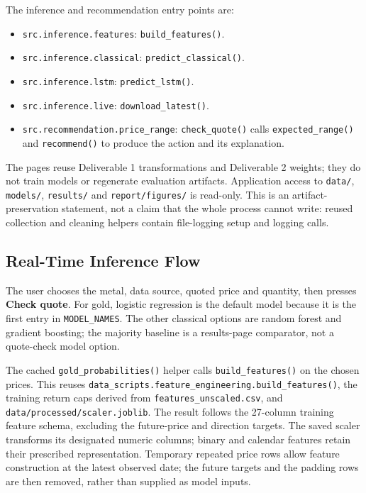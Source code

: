 The inference and recommendation entry points are:
\begin{itemize}
    \item \texttt{src.\allowbreak inference.\allowbreak features}:
    \texttt{build\_\allowbreak features()}.
    \item \texttt{src.\allowbreak inference.\allowbreak classical}:
    \texttt{predict\_\allowbreak classical()}.
    \item \texttt{src.\allowbreak inference.\allowbreak lstm}:
    \texttt{predict\_\allowbreak lstm()}.
    \item \texttt{src.\allowbreak inference.\allowbreak live}:
    \texttt{download\_\allowbreak latest()}.
    \item \texttt{src.\allowbreak recommendation.\allowbreak price\_\allowbreak range}:
    \texttt{check\_\allowbreak quote()} calls \texttt{expected\_\allowbreak range()}
    and \texttt{recommend()} to produce the action and its explanation.
\end{itemize}

The pages reuse Deliverable 1 transformations and Deliverable 2 weights; they
do not train models or regenerate evaluation artifacts. Application access
to \texttt{data/}, \texttt{models/}, \texttt{results/} and
\texttt{report/figures/} is read-only. This is an artifact-preservation
statement, not a claim that the whole process cannot write: reused collection
and cleaning helpers contain file-logging setup and logging calls.

\subsection{Real-Time Inference Flow}
The user chooses the metal, data source, quoted price and quantity, then
presses \textbf{Check quote}. For gold, logistic regression is the default
model because it is the first entry in \texttt{MODEL\_NAMES}. The other
classical options are random forest and gradient boosting; the majority
baseline is a results-page comparator, not a quote-check model option.

The cached \texttt{gold\_probabilities()} helper calls
\texttt{build\_features()} on the chosen prices. This reuses
\texttt{data\_scripts.feature\_engineering.build\_features()}, the training
return caps derived from \texttt{features\_unscaled.csv}, and
\texttt{data/processed/scaler.joblib}. The result follows the 27-column
training feature schema, excluding the future-price and direction targets.
The saved scaler transforms its designated numeric columns; binary and
calendar features retain their prescribed representation. Temporary repeated
price rows allow feature construction at the latest observed date; the
future targets and the padding rows are then removed, rather than supplied
as model inputs.

